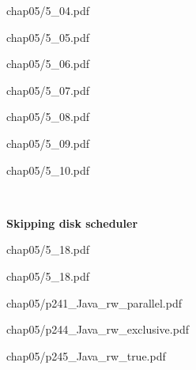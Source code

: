 \documentclass{article}
\newcommand{\nop}[1]{}
\newcommand{\myfig}[1]{\newpage\begin{overpic}[scale=1.5]{#1}}
\newcommand{\myfigs}[2]{\newpage\begin{overpic}[scale=#1]{#2}}
\newcommand{\myfigsp}[3]{\newpage\begin{overpic}[scale=#1,page=#2]{#3}}
\newcommand{\myfigend}{\end{overpic}}
\newcommand{\ti}[1]{
\newpage
\mbox{~}

\vspace{1.25in}
\centerline{\bf #1}
}
\begin{document}
\myfig{chap05/5_04.pdf}
\myfigend
\myfig{chap05/5_05.pdf}
\myfigend
\myfig{chap05/5_06.pdf}
\myfigend
\myfig{chap05/5_07.pdf}
\myfigend
\myfig{chap05/5_08.pdf}
\myfigend
\myfig{chap05/5_09.pdf}
\myfigend
\myfig{chap05/5_10.pdf}
\myfigend

\ti{Skipping disk scheduler}
\newpage
\nop{
\myfig{chap05/5_11.pdf}
\myfigend
\myfig{chap05/5_12.pdf}
\myfigend
\myfig{chap05/5_13.pdf}
\myfigend
\myfig{chap05/5_14.pdf}
\myfigend
\myfig{chap05/5_15.pdf}
\myfigend
\myfigs{1.1}{chap05/5_16.pdf}
\myfigend
\myfig{chap05/5_17.pdf}
\myfigend
\myfig{chap05/p236_Disk_Access.pdf}
\myfigend
}
\myfigsp{.9}{1}{chap05/5_18.pdf}
\myfigend
\myfigsp{.9}{2}{chap05/5_18.pdf}
\myfigend
\myfigs{1}{chap05/p241_Java_rw_parallel.pdf}
\myfigend
\myfig{chap05/p244_Java_rw_exclusive.pdf}
\myfigend
\myfig{chap05/p245_Java_rw_true.pdf}
\myfigend
\end{document}
